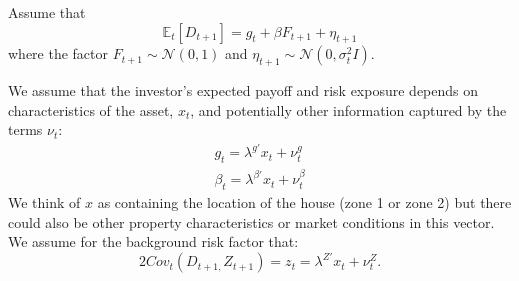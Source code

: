 \documentclass[letterpaper,12pt,dvipsnames,usenames]{article}
\newcommand{\E}{\mathbb{E}}
\theoremstyle{definition}
\begin{document}
\begin{spacing}{1.0}
\begin{small}
Assume that \[\E_t[D_{t+1}]=g_t+\beta F_{t+1}+\eta_{t+1}\]
where the factor $F_{t+1} \sim \mathcal{N}(0,1)$ and $\eta_{t+1} \sim \mathcal{N}(0,\sigma_{t}^2 I)$.

We assume that the investor's expected payoff and risk exposure depends on characteristics of the asset, $x_{t}$, and potentially other information captured by the terms $\nu_{t}$:
\begin{eqnarray}
g_{t} = \lambda^{g \prime}x_{t} + \nu_{t}^g \label{eq:g}\\
\beta_{t} = \lambda^{\beta \prime}x_{t} + \nu_{t}^{\beta} \label{eq:beta}
\end{eqnarray}
We think of $x$ as containing the location of the house (zone 1 or zone 2) but there could also be other property characteristics or market conditions in this vector. We assume for the background risk factor that:
\[ 2 Cov_t(D_{t+1,}Z_{t+1})=z_t = \lambda^{Z \prime}x_{t} + \nu_{t}^Z.\]


\end{small}
\end{spacing}
\end{document}
